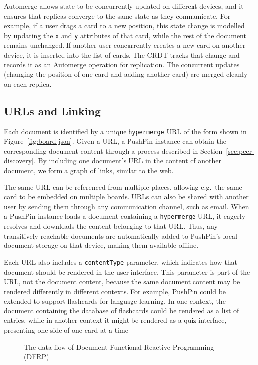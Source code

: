 \documentclass[sigplan,10pt]{acmart}
\begin{document}
Automerge allows state to be concurrently updated on different devices, and it ensures that replicas converge to the same state as they communicate.
For example, if a user drags a card to a new position, this state change is modelled by updating the \texttt{x} and \texttt{y} attributes of that card, while the rest of the document remains unchanged.
If another user concurrently creates a new card on another device, it is inserted into the list of cards.
The CRDT tracks that change and records it as an Automerge operation for replication.
The concurrent updates (changing the position of one card and adding another card) are merged cleanly on each replica.

\subsection{URLs and Linking}

Each document is identified by a unique \texttt{hypermerge} URL of the form shown in Figure~\ref{fig:board-json}.
Given a URL, a PushPin instance can obtain the corresponding document content through a process described in Section~\ref{sec:peer-discovery}.
By including one document's URL in the content of another document, we form a graph of links, similar to the web.

The same URL can be referenced from multiple places, allowing e.g.\ the same card to be embedded on multiple boards.
URLs can also be shared with another user by sending them through any communication channel, such as email.
When a PushPin instance loads a document containing a \texttt{hypermerge} URL, it eagerly resolves and downloads the content belonging to that URL.
Thus, any transitively reachable documents are automatically added to PushPin's local document storage on that device, making them available offline.

Each URL also includes a \texttt{contentType} parameter, which indicates how that document should be rendered in the user interface.
This parameter is part of the URL, not the document content, because the same document content may be rendered differently in different contexts.
For example, PushPin could be extended to support flashcards for language learning.
In one context, the document containing the database of flashcards could be rendered as a list of entries, while in another context it might be rendered as a quiz interface, presenting one side of one card at a time.

\begin{figure}
\caption{The data flow of Document Functional Reactive Programming (DFRP)}
\label{fig:document-frp}
\end{figure}
\end{document}
